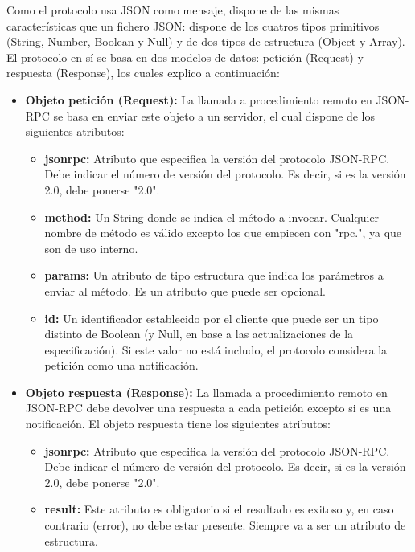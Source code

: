 \documentclass[spanish,12pt, a4paper, twoside]{paper}
\begin{document}
Como el protocolo usa JSON como mensaje, dispone de las mismas características que un fichero JSON: dispone de los cuatros tipos primitivos (String, Number, Boolean y Null) y de dos tipos de estructura (Object y Array).
El protocolo en sí se basa en dos modelos de datos: petición (Request) y respuesta (Response), los cuales explico a continuación:

\begin{itemize}
\item \textbf{Objeto petición (Request):} La llamada a procedimiento remoto en JSON-RPC se basa en enviar este objeto a un servidor, el cual dispone de los siguientes atributos:

\begin{itemize}
\item \textbf{jsonrpc:} Atributo que especifica la versión del protocolo JSON-RPC. Debe indicar el número de versión del protocolo. Es decir, si es la versión 2.0, debe ponerse "2.0".

\item \textbf{method:} Un String donde se indica el método a invocar. Cualquier nombre de método es válido excepto los que empiecen con "rpc.", ya que son de uso interno.

\item \textbf{params:} Un atributo de tipo estructura que indica los parámetros a enviar al método. Es un atributo que puede ser opcional.

\item \textbf{id:} Un identificador establecido por el cliente que puede ser un tipo distinto de Boolean (y Null, en base a las actualizaciones de la especificación). Si este valor no está includo, el protocolo considera la petición como una notificación.
\end{itemize}

\item \textbf{Objeto respuesta (Response):} La llamada a procedimiento remoto en JSON-RPC debe devolver una respuesta a cada petición excepto si es una notificación. El objeto respuesta tiene los siguientes atributos:

\begin{itemize}
\item \textbf{jsonrpc:} Atributo que especifica la versión del protocolo JSON-RPC. Debe indicar el número de versión del protocolo. Es decir, si es la versión 2.0, debe ponerse "2.0".

\item \textbf{result:} Este atributo es obligatorio si el resultado es exitoso y, en caso contrario (error), no debe estar presente. Siempre va a ser un atributo de estructura.


\end{itemize}
\end{itemize}
\end{document}
